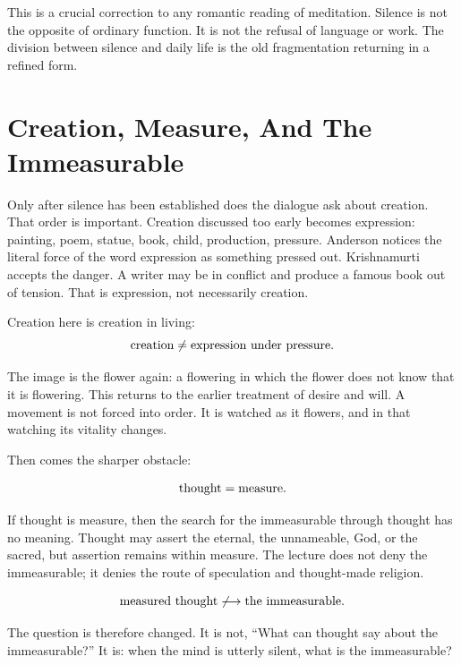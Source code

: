 \documentclass[11pt,oneside]{book}
\begin{document}
This is a crucial correction to any romantic reading of meditation. Silence is not the opposite of ordinary function. It is not the refusal of language or work. The division between silence and daily life is the old fragmentation returning in a refined form.

\section{Creation, Measure, And The Immeasurable}

Only after silence has been established does the dialogue ask about creation. That order is important. Creation discussed too early becomes expression: painting, poem, statue, book, child, production, pressure. Anderson notices the literal force of the word expression as something pressed out. Krishnamurti accepts the danger. A writer may be in conflict and produce a famous book out of tension. That is expression, not necessarily creation.

Creation here is creation in living:
\begin{equation}
\hbox{creation}
\neq
\hbox{expression under pressure}.
\end{equation}

The image is the flower again: a flowering in which the flower does not know that it is flowering. This returns to the earlier treatment of desire and will. A movement is not forced into order. It is watched as it flowers, and in that watching its vitality changes.

Then comes the sharper obstacle:

\begin{equation}
\hbox{thought}=\hbox{measure}.
\end{equation}

If thought is measure, then the search for the immeasurable through thought has no meaning. Thought may assert the eternal, the unnameable, God, or the sacred, but assertion remains within measure. The lecture does not deny the immeasurable; it denies the route of speculation and thought-made religion.

\begin{equation}
\hbox{measured thought}
\not\longrightarrow
\hbox{the immeasurable}.
\end{equation}

The question is therefore changed. It is not, ``What can thought say about the immeasurable?'' It is: when the mind is utterly silent, what is the immeasurable?
\end{document}
